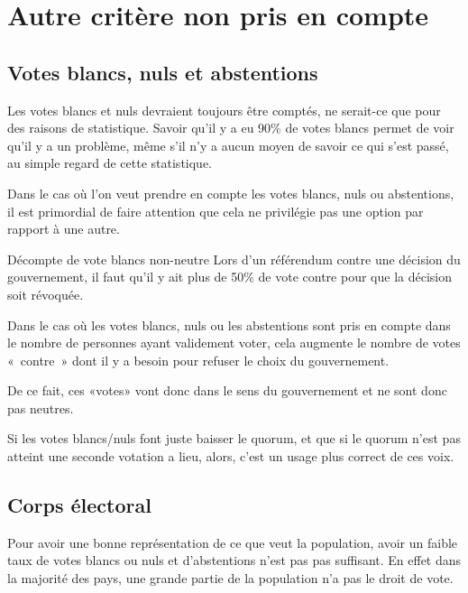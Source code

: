 \documentclass[../report]{subfiles}
\begin{document}
  \section{Autre critère non pris en compte}
  \subsection{Votes blancs, nuls et abstentions}

  Les votes blancs et nuls devraient toujours être comptés, ne serait-ce que pour des raisons de
  statistique.
  Savoir qu'il y a eu 90\% de votes blancs permet de voir qu'il y a un problème, même
  s'il n'y a aucun moyen de savoir ce qui s'est passé, au simple regard de cette statistique.

  Dans le cas où l'on veut prendre en compte les votes blancs, nuls ou abstentions, il est primordial
  de faire attention que cela ne privilégie pas une option par rapport à une autre.

  \begin{nota}{Décompte de vote blancs non-neutre}
    Lors d'un référendum contre une décision du gouvernement, il faut qu'il y ait plus de 50\% 
    de vote contre pour que la décision soit révoquée.

    Dans le cas où les votes blancs, nuls ou les abstentions sont pris en compte dans 
    le nombre de personnes ayant validement voter, cela augmente le nombre de votes «~contre~» 
    dont il y a besoin pour refuser le choix du gouvernement.

    De ce fait, ces «votes» vont donc dans le sens du gouvernement et ne sont donc pas neutres. 

    Si les votes blancs/nuls font juste baisser le quorum, et que si le quorum n'est pas atteint
    une seconde votation a lieu, alors, c'est un usage plus correct de ces voix.
  \end{nota}


  \subsection{Corps électoral}

  Pour avoir une bonne représentation de ce que veut la population, avoir un faible taux de votes
  blancs ou nuls et d'abstentions n'est pas pas suffisant.
  En effet dans la majorité des pays, une grande partie de la population n'a pas le droit de vote.
\end{document}
